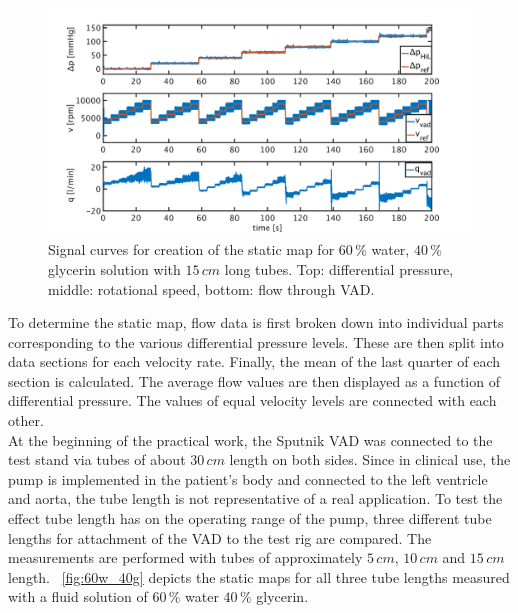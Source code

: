\begin{figure}[ht]
  \centering
  \includegraphics[width=\textwidth]{images/chapt_4/Test_60w40g_long.pdf}
  \caption[Signal curves for creation of the static map]{Signal curves for creation of the static map for $60\,\%$ water, $40\,\%$ glycerin solution with $15 \, cm$ long tubes. Top: differential pressure, middle: rotational speed, bottom: flow through VAD.}
  \label{fig:test_60w40g_long}
\end{figure}
To determine the static map, flow data is first broken down into individual parts corresponding to the various differential pressure levels.  These are then split into data sections for each velocity rate. Finally, the mean of the last quarter of each section is calculated. The average flow values are then displayed as a function of differential pressure. The values of equal velocity levels are connected with each other.
\\At the beginning of the practical work, the Sputnik VAD was connected to the test stand via tubes of about $30\, cm$ length on both sides. Since in clinical use, the pump is implemented in the patient's body and connected to the left ventricle and aorta, the tube length is not representative of a real application. To test the effect tube length has on the operating range of the pump, three different tube lengths for attachment of the VAD to the test rig are compared. The measurements are performed with tubes of approximately $5\, cm$, $10\, cm$ and $15\, cm$ length. \figurename~\ref{fig:60w_40g} depicts the static maps for all three tube lengths measured with a fluid solution of $60\, \%$ water $40\, \%$ glycerin.
